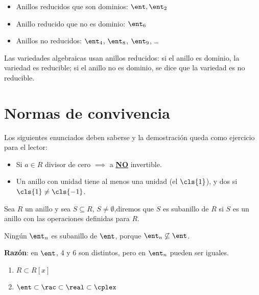 \begin{example}
	\begin{itemize}
		\item Anillos reducidos que son dominios: $\ent, \ent_2$
		\item Anillo reducido que no es dominio: $\ent_6$
		\item Anillos no reducidos: $\ent_4$, $\ent_8$, $\ent_9$, \dots
	\end{itemize}
\end{example}

\obs Las variedades algebraicas usan anillos reducidos: si el anillo es dominio, la variedad es reducible; si el anillo no es dominio, se dice que la variedad es no reducible.

\section{Normas de convivencia}
Los siguientes enunciados deben saberse y la demostración queda como ejercicio para el lector: %

\begin{itemize}
	\item Si $a \in R$ divisor de cero $\implies$ a \underline{\bf NO} invertible.
	\item Un anillo con unidad tiene al menos una unidad (el $\cls{1}$), y dos si $\cls{1} \neq \cls{-1}$. %
\end{itemize}

\begin{defn}[Subanillo]
Sea $R$ un anillo y sea $S \subseteq R$, $S \neq \emptyset$,diremos que $S$ es subanillo de $R$ si $S$ es un anillo con las operaciones definidas para $R$.
\end{defn}

\begin{prop}
Ningún $\ent_n$ es subanillo de $\ent$, porque $\ent_n \not \subseteq \ent$.

{\bf Razón}: en $\ent$, 4 y 6 son distintos, pero en $\ent_n$ pueden ser iguales.
\end{prop}

\begin{example}
	\begin{enumerate}
		\item $R \subset R[x]$
		\item $\ent \subset \rac \subset \real \subset \cplex$
	\end{enumerate}
\end{example}

